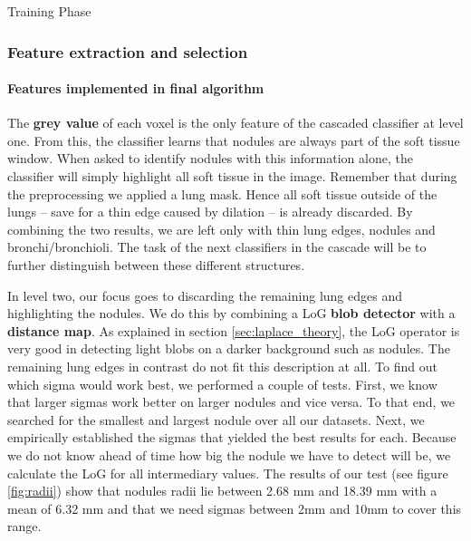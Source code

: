 \begin{algorithm}[ht]
	\DontPrintSemicolon
	\caption{Training Phase\label{alg:train}}
\end{algorithm}

\subsubsection{Feature extraction and selection} \label{sec:featureExtraction}
\paragraph{Features implemented in final algorithm}
The \textbf{grey value} of each voxel is the only feature of the cascaded
classifier at level one. From this, the classifier learns that nodules are
always part of the soft tissue window. When asked to identify nodules with this
information alone, the classifier will simply highlight all soft tissue in the
image. Remember that during the preprocessing we applied a lung mask. Hence all
soft tissue outside of the lungs -- save for a thin edge caused by dilation --
is already discarded. By combining the two results, we are left only with thin
lung edges, nodules and bronchi/bronchioli. The task of the next classifiers in
the cascade will be to further distinguish between these different structures.

In level two, our focus goes to discarding the remaining lung edges and
highlighting the nodules. We do this by combining a LoG \textbf{blob detector}
with a \textbf{distance map}. As explained in section \ref{sec:laplace_theory},
the LoG operator is very good in detecting light blobs on a darker background
such as nodules. The remaining lung edges in contrast do not fit this
description at all. To find out which sigma would work best, we performed a
couple of tests. First, we know that larger sigmas work better on larger nodules
and vice versa. To that end, we searched for the smallest and largest nodule
over all our datasets. Next, we empirically established the sigmas that yielded
the best results for each. Because we do not know ahead of time how big the
nodule we have to detect will be, we calculate the LoG for all intermediary
values. The results of our test (see figure \ref{fig:radii}) show that nodules
radii lie between 2.68 mm and 18.39 mm with a mean of 6.32 mm and that
we need sigmas between 2mm and 10mm to cover this range.

